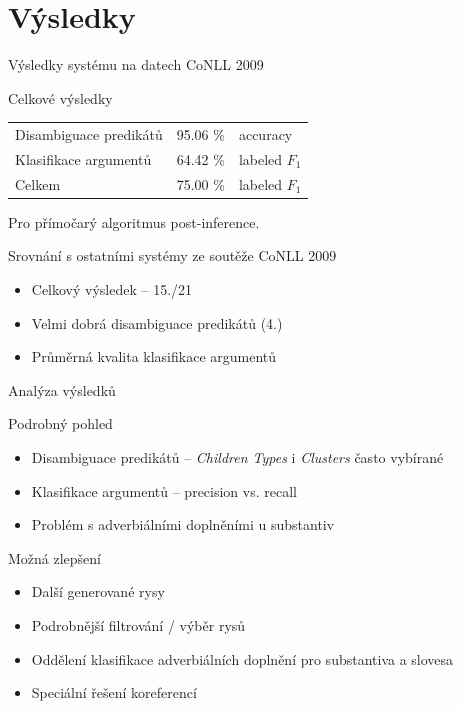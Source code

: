 \documentclass[hyperref={unicode=true}]{beamer}
\begin{document}
\section{Výsledky}

\begin{frame}{Výsledky systému na datech CoNLL 2009}
    \begin{block}{Celkové výsledky}
    \begin{tabular}{lcl}
        Disambiguace predikátů & 95.06 \% & accuracy \\
        Klasifikace argumentů &  64.42 \% & labeled $F_1$ \\
        Celkem & 75.00 \% & labeled $F_1$ \\ 
    \end{tabular}
    
    Pro přímočarý algoritmus post-inference.
    \end{block}
    
    \begin{block}{Srovnání s ostatními systémy ze soutěže CoNLL 2009}
    \begin{itemize}
        \item Celkový výsledek -- 15./21        
        \item Velmi dobrá disambiguace predikátů (4.)
        \item Průměrná kvalita klasifikace argumentů        
    \end{itemize}
    \end{block}
\end{frame}

\begin{frame}{Analýza výsledků}

    \begin{block}{Podrobný pohled}
    \begin{itemize}
        \item Disambiguace predikátů -- \emph{Children Types} i \emph{Clusters} často vybírané
        \item Klasifikace argumentů -- precision vs. recall
        \item Problém s adverbiálními doplněními u substantiv  
    \end{itemize}
    \end{block}

    \begin{block}{Možná zlepšení}
    \begin{itemize}
        \item Další generované rysy
        \item Podrobnější filtrování / výběr rysů
        \item Oddělení klasifikace adverbiálních doplnění pro substantiva a slovesa
        \item Speciální řešení koreferencí  
    \end{itemize}
    \end{block}
\end{frame}
\end{document}
